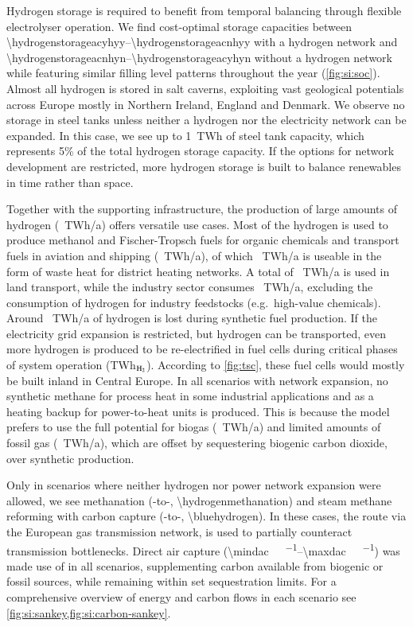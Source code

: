 Hydrogen storage is required to benefit from temporal balancing through flexible
electrolyser operation. We find cost-optimal storage capacities between
\SIrange{\hydrogenstorageacyhyy}{\hydrogenstorageacnhyy}{\twh} with a hydrogen
network and \SIrange{\hydrogenstorageacnhyn}{\hydrogenstorageacyhyn}{\twh}
without a hydrogen network while featuring similar filling level patterns
throughout the year (\cref{fig:si:soc}). Almost all hydrogen is stored in salt
caverns, exploiting vast geological potentials across Europe mostly in Northern
Ireland, England and Denmark. We observe no storage in steel tanks unless
neither a hydrogen nor the electricity network can be expanded. In this case, we
see up to 1~TWh of steel tank capacity, which represents 5\% of the total
hydrogen storage capacity. If the options for network development are
restricted, more hydrogen storage is built to balance renewables in time rather
than space.

Together with the supporting infrastructure, the production of large amounts of
hydrogen (\hydrogenproduction~TWh/a) offers versatile use cases. Most of the
hydrogen is used to produce methanol and Fischer-Tropsch fuels for organic
chemicals and transport fuels in aviation and shipping
(\ptlhydrogenusage~TWh/a), of which \ptlwasteheat~TWh/a is useable  in the form
of waste heat for district heating networks. A total of
\hydrogentransportdemand~TWh/a is used in land transport, while the industry
sector consumes \hydrogenindustrydemand~TWh/a, excluding the consumption of hydrogen for
industry feedstocks (e.g.~high-value chemicals). Around \hydrogenlosses~TWh/a of
hydrogen is lost during synthetic fuel production. If the electricity grid
expansion is restricted, but hydrogen can be transported, even more hydrogen is
produced to be re-electrified in fuel cells during critical phases of system
operation (\hydrogenfuelcell TWh$_{\ce{H2}}$). According to \cref{fig:tsc},
these fuel cells would mostly be built inland in Central Europe. In all scenarios with
network expansion, no synthetic methane for process
heat in some industrial applications and as a heating backup for power-to-heat
units is produced. This is because the model prefers to use the full potential
for biogas (\biogas~TWh/a) and limited amounts of fossil gas (\fossilgas~TWh/a),
which are offset by sequestering biogenic carbon dioxide, over synthetic
production.

Only in scenarios where neither hydrogen nor power network expansion were
allowed, we see methanation (-to-,
\SI{\hydrogenmethanation}{\twh}) and steam methane reforming with carbon capture
(-to-, \SI{\bluehydrogen}{\twh}). In these cases, the route via
the European gas transmission network, is used to partially counteract
transmission bottlenecks. Direct air capture
(\SIrange{\mindac}{\maxdac}{\mega\tco\per\year}) was made use of in all
scenarios, supplementing carbon available from biogenic or fossil sources, while
remaining within set sequestration limits. For a comprehensive
overview of energy and carbon flows in each scenario see
\cref{fig:si:sankey,fig:si:carbon-sankey}.


